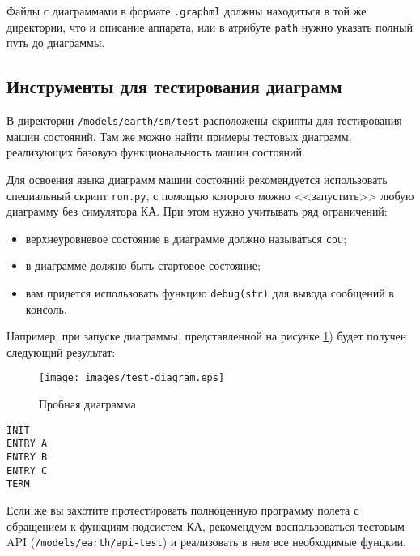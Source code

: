 \documentclass[12pt,a4paper]{article}
\begin{document}
Файлы с диаграммами в формате \verb'.graphml' должны находиться в той же директории, что и
описание аппарата, или в атрибуте \verb'path' нужно указать полный путь до диаграммы.

\subsection*{Инструменты для тестирования диаграмм}

В директории \verb'/models/earth/sm/test' расположены скрипты для тестирования машин
состояний. Там же можно найти примеры тестовых диаграмм, реализующих базовую
функциональность машин состояний.

Для освоения языка диаграмм машин состояний рекомендуется использовать
специальный скрипт \verb'run.py', с помощью которого можно <<запустить>> любую диаграмму
без симулятора КА. При этом нужно учитывать ряд ограничений:

\begin{itemize}
\item верхнеуровневое состояние в диаграмме должно называться \verb'cpu';
\item в диаграмме должно быть стартовое состояние;
\item вам придется использовать функцию \verb'debug(str)' для вывода сообщений в консоль.
\end{itemize}

Например, при запуске диаграммы, представленной на рисунке \ref{Pic:TestDiagr}) будет получен следующий результат:

\begin{figure}[tbh]
  \begin{center}
    \texttt{[image: images/test-diagram.eps]}
    \caption{Пробная диаграмма}
    \label{Pic:TestDiagr}
  \end{center}
\end{figure}

\begin{verbatim}
INIT
ENTRY A
ENTRY B
ENTRY C
TERM
\end{verbatim}

Если же вы захотите протестировать полноценную программу полета с обращением к функциям
подсистем КА, рекомендуем воспользоваться тестовым API (\verb'/models/earth/api-test') и
реализовать в нем все необходимые фунцкии.
\end{document}
